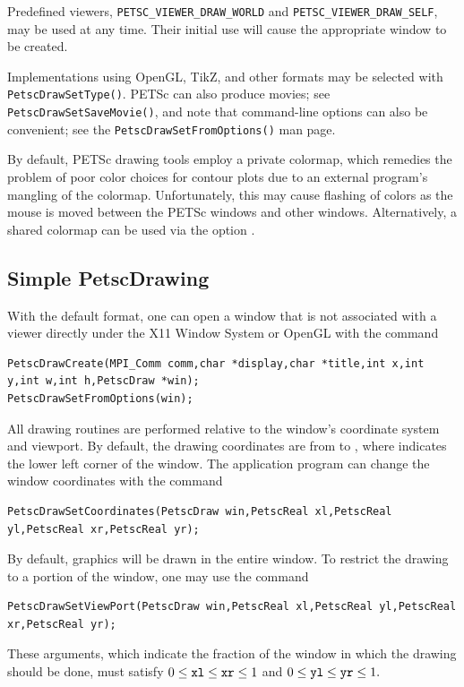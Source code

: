 {{Predefined viewers, \lstinline{PETSC_VIEWER_DRAW_WORLD}
and \lstinline{PETSC_VIEWER_DRAW_SELF}, may be used at any time. Their initial
use will cause the appropriate window to be created.

Implementations using OpenGL, TikZ, and other formats may be selected with
\lstinline{PetscDrawSetType()}.
PETSc can also produce movies; see \lstinline{PetscDrawSetSaveMovie()}, and
note that command-line options can also be convenient; see the \lstinline{PetscDrawSetFromOptions()} man page.

\medskip
By default, PETSc drawing tools employ a private colormap,
which remedies the problem of poor color choices for contour plots due
to an external program's mangling of the colormap.
Unfortunately, this may cause flashing of colors as the mouse is moved
between the PETSc windows and other windows.  Alternatively, a shared
colormap can be used via the option .

\subsection{Simple PetscDrawing}

With the default format, one can open a window that is not associated with a viewer directly
under the X11 Window System or OpenGL with the
command  
\begin{lstlisting}
PetscDrawCreate(MPI_Comm comm,char *display,char *title,int x,int y,int w,int h,PetscDraw *win);
PetscDrawSetFromOptions(win);
\end{lstlisting}
All drawing routines are performed relative to the window's coordinate system
and viewport. By default, the drawing coordinates are from  to
, where  indicates the lower left corner of the
window. The application program can change the window coordinates with the
command  
\begin{lstlisting}
PetscDrawSetCoordinates(PetscDraw win,PetscReal xl,PetscReal yl,PetscReal xr,PetscReal yr);
\end{lstlisting}
By default, graphics will be drawn in the entire window. To restrict the
drawing to a portion of the window, one may
use the command
\begin{lstlisting}
PetscDrawSetViewPort(PetscDraw win,PetscReal xl,PetscReal yl,PetscReal xr,PetscReal yr);
\end{lstlisting}
These arguments, which indicate the fraction of the window in which the
drawing should be done, must satisfy
$ 0 \leq {\tt xl} \leq {\tt xr} \leq 1 $ and $ 0 \leq {\tt yl} \leq {\tt yr} \leq 1.$

}}
